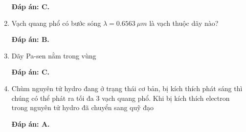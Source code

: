 \begin{enumerate}[label=\bfseries Câu \arabic*:]
{		
	}
	
	\loigiai
	{		\textbf{Đáp án: C.}
		
		
	}	
		\item {}
		\cauhoi
	{ Vạch quang phổ có bước sóng $\lambda = \SI{0,6563}{\mu m}$ là vạch thuộc dãy nào?
		
		
	}
	
	\loigiai
	{		\textbf{Đáp án: B.}
		
		
	}	
		\item {}
		\cauhoi
	{ Dãy Pa-sen nằm trong vùng
		
		
	}
	
	\loigiai
	{		\textbf{Đáp án: C.}
		
		
	}	
		\item {}
		\cauhoi
	{ 
		Chùm nguyên tử hydro đang ở trạng thái cơ bản, bị kích thích phát sáng thì chúng có thể phát ra tối đa 3 vạch quang phổ. Khi bị kích thích electron trong nguyên tử hydro đã chuyển sang quỹ đạo
	}
	
	\loigiai
	{		\textbf{Đáp án: A.}
		
}
\end{enumerate}
